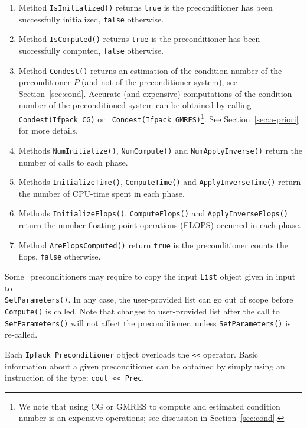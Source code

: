 \begin{enumerate}
\item Method \verb!IsInitialized()! returns {\tt true} is the preconditioner has
been successfully initialized, {\tt false} otherwise.
%
\item Method \verb!IsComputed()! returns {\tt true} is the preconditioner has
been successfully computed, {\tt false} otherwise.
%
\item Method \verb!Condest()! returns an estimation of the condition
number of the preconditioner $P$ (and not of the preconditioner system), see
Section~\ref{sec:cond}. 
Accurate (and expensive) computations of the condition number of
the preconditioned system can be
obtained by calling {\tt Condest(Ifpack\_CG)} or {\tt
  Condest(Ifpack\_GMRES)}\footnote{We note that using CG or GMRES to compute
and estimated condition number is an expensive operations; see discussion in
  Section~\ref{sec:cond}.}.
See Section~\ref{sec:a-priori} for more details.
%
\item Methods \verb!NumInitialize()!, \verb!NumCompute()! and
\verb!NumApplyInverse()! return the number of calls to each phase.
%
\item Methods \verb!InitializeTime()!, \verb!ComputeTime()! and
\verb!ApplyInverseTime()! return the number of CPU-time spent in each phase.
%
\item Methods \verb!InitializeFlops()!, \verb!ComputeFlops()! and
\verb!ApplyInverseFlops()! return the number floating point operations (FLOPS)
  occurred in each phase.
%
\item Method \verb!AreFlopsComputed()! return \verb!true! is the
  preconditioner counts the flops, \verb~false~ otherwise.
\end{enumerate}


\begin{remark}
Some \ifpack\ preconditioners may require to copy the input \verb!List! object
given in input to \\ \verb!SetParameters()!. In any case, the
user-provided list can go out of scope before \verb!Compute()! is called.
Note that changes to user-provided list after the call to
\verb!SetParameters()! will not affect the preconditioner,
  unless \verb!SetParameters()!  is re-called.
\end{remark}

\begin{remark}
Each \verb!Ipfack_Preconditioner! object overloads the \verb!<<! operator.
Basic information about a given preconditioner can be obtained by simply
using an instruction of the type: \verb!cout << Prec!.
\end{remark}

